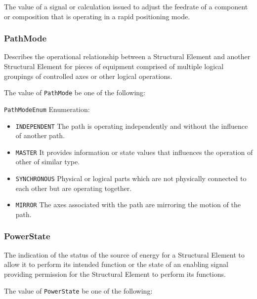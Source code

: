The value of a signal or calculation issued to adjust the feedrate of a component or composition that is operating in a rapid positioning mode.


\subsubsection{PathMode}
\label{sec:PathMode}



Describes the operational relationship between a  \gls{Structural Element} and another  \gls{Structural Element} for pieces of equipment comprised of multiple logical groupings of controlled axes or other logical operations.


The value of \texttt{PathMode} \MUST be one of the following: 


\texttt{PathModeEnum} Enumeration:

\begin{itemize}
\item \texttt{INDEPENDENT} \newline The path is operating independently and without the influence of another path. 
\item \texttt{MASTER} \newline It provides information or state values that influences the operation of other  of similar type. 
\item \texttt{SYNCHRONOUS} \newline Physical or logical parts which are not physically connected to each other but are operating together. 
\item \texttt{MIRROR} \newline The axes associated with the path are mirroring the motion of the  path. 
\end{itemize}

\FloatBarrier

\subsubsection{PowerState}
\label{sec:PowerState}



The indication of the status of the source of energy for a \gls{Structural Element} to allow it to perform its intended function or the state of an enabling signal providing permission for the \gls{Structural Element} to perform its functions.


The value of \texttt{PowerState} \MUST be one of the following: 


